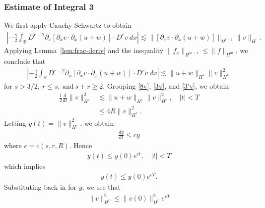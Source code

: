 \documentclass[12pt,reqno]{amsart}
\numberwithin{equation}{section}  %
\numberwithin{figure}{section}
\newcommand{\rr}{\mathbb{R}}
\newcommand{\p}{\partial}
\begin{document}
\subsubsection{Estimate of Integral 3} We first apply
Cauchy-Schwartz to obtain
%
%
\begin{equation*}
\begin{split}
\left | - \frac{\gamma}{2} \int_{\rr} D^{r 
-2} \p_x [ \p_x v
\cdot \p_x (u+w)]\cdot D^r v \ dx \right | 
 \lesssim 
\|[\p_x v \cdot \p_x (u+w)] \|_{H^{r -1}}
\|v\|_{H^r}.
\end{split}
\end{equation*}
%
%
Applying Lemma~\ref{lem:frac-deriv} and the inequality $\| f_{x}
\|_{H^{m-1}} \le \| f \|_{H^{m}}$,  we conclude that
%
\begin{equation}
\begin{split}
\left | - \frac{\gamma}{2} \int_{\rr} D^{r 
-2} \p_x [ \p_x v
\cdot \p_x (u+w)]\cdot D^r v \ dx \right | 
 \lesssim \|u+w \|_{H^{s}}
\|v\|_{H^r}^2
\label{3'v}
\end{split}
\end{equation}
%
%
for $s > 3/2, \ r \le s, \ \text{and} \ s + r \ge 2$.
%
%
%
%
Grouping \eqref{8v}, \eqref{3v}, and \eqref{3'v}, we obtain
%
%
\begin{equation}
\begin{split}
\frac{1}{2} \frac{d}{dt}
\|v\|_{H^r}^2
& \lesssim \|u+w\|_{H^s}
\|v\|_{H^r}^2, \quad | t | < T
\\
& \le 4R \| v \|_{H^{r}}^{2}.
\label{9v}
\end{split}
\end{equation}
%
%
%
%
%
Letting $y(t) = \| v \|^{2}_{H^{r}}$, we obtain
%
%
%
\begin{equation*}
\begin{split}
  \frac{dy}{dt} \le cy
\end{split}
\end{equation*}
%
where $c = c(s, r, R)$. Hence
%
%
\begin{equation*}
\begin{split}
  y(t) \le y(0) e^{ct}, \quad | t | < T
\end{split}
\end{equation*}
%
%
which implies
%
%
\begin{equation*}
\begin{split}
  y(t) \le y(0) e^{cT}.
\end{split}
\end{equation*}
%
%
Substituting back in for $y$, we see that
%
%
\begin{equation*}
\begin{split}
  \| v \|_{H^{r}}^{2} \le \| v(0) \|^{2}_{H^{r}} e^{cT}
\end{split}
\end{equation*}
\end{document}
